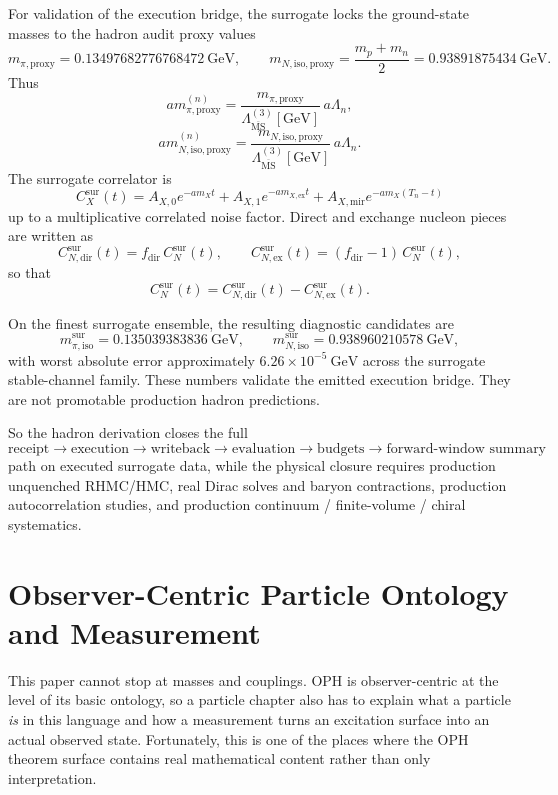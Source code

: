 \documentclass[11pt]{article}
\begin{document}
For validation of the execution bridge, the surrogate locks the ground-state masses to the hadron
audit proxy values
\[
m_{\pi,\mathrm{proxy}} = 0.13497682776768472\ \mathrm{GeV},
\qquad
m_{N,\mathrm{iso,proxy}}
=
\frac{m_p+m_n}{2}
=
0.93891875434\ \mathrm{GeV}.
\]
Thus
\[
a m_{\pi,\mathrm{proxy}}^{(n)}
=
\frac{m_{\pi,\mathrm{proxy}}}{\Lambda_{\overline{\mathrm{MS}}}^{(3)}[\mathrm{GeV}]}
\,a\Lambda_n,
\]
\[
a m_{N,\mathrm{iso,proxy}}^{(n)}
=
\frac{m_{N,\mathrm{iso,proxy}}}{\Lambda_{\overline{\mathrm{MS}}}^{(3)}[\mathrm{GeV}]}
\,a\Lambda_n.
\]
The surrogate correlator is
\[
C_X^{\mathrm{sur}}(t)
=
A_{X,0} e^{-a m_X t}
+
A_{X,1} e^{-a m_{X,\mathrm{ex}} t}
+
A_{X,\mathrm{mir}} e^{-a m_X (T_n-t)}
\]
up to a multiplicative correlated noise factor. Direct and exchange nucleon pieces are written as
\[
C_{N,\mathrm{dir}}^{\mathrm{sur}}(t)
=
f_{\mathrm{dir}}\,C_N^{\mathrm{sur}}(t),
\qquad
C_{N,\mathrm{ex}}^{\mathrm{sur}}(t)
=
(f_{\mathrm{dir}}-1)\,C_N^{\mathrm{sur}}(t),
\]
so that
\[
C_N^{\mathrm{sur}}(t)
=
C_{N,\mathrm{dir}}^{\mathrm{sur}}(t)
-
C_{N,\mathrm{ex}}^{\mathrm{sur}}(t).
\]

On the finest surrogate ensemble, the resulting diagnostic candidates are
\[
m_{\pi,\mathrm{iso}}^{\mathrm{sur}} = 0.135039383836\ \mathrm{GeV},
\qquad
m_{N,\mathrm{iso}}^{\mathrm{sur}} = 0.938960210578\ \mathrm{GeV},
\]
with worst absolute error approximately \(6.26\times10^{-5}\ \mathrm{GeV}\) across the surrogate
stable-channel family. These numbers validate the emitted execution bridge. They are not
promotable production hadron predictions.

So the hadron derivation closes the full
\[
\text{receipt} \to \text{execution} \to \text{writeback} \to \text{evaluation} \to \text{budgets} \to \text{forward-window summary}
\]
path on executed surrogate data, while the physical closure requires production
unquenched RHMC/HMC, real Dirac solves and baryon contractions, production autocorrelation
studies, and production continuum / finite-volume / chiral systematics.

\section{Observer-Centric Particle Ontology and Measurement}

This paper cannot stop at masses and couplings. OPH is observer-centric at the level of
its basic ontology, so a particle chapter also has to explain what a particle \emph{is} in this
language and how a measurement turns an excitation surface into an actual observed state.
Fortunately, this is one of the places where the OPH theorem surface contains
real mathematical content rather than only interpretation.
\end{document}
